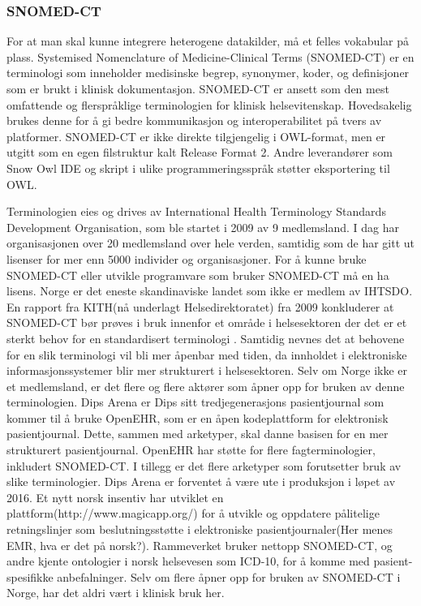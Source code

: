 \subsubsection{SNOMED-CT}
For at man skal kunne integrere heterogene datakilder, må et felles vokabular på plass. Systemised Nomenclature of Medicine-Clinical Terms (SNOMED-CT) er en terminologi som inneholder medisinske begrep, synonymer, koder, og definisjoner som er brukt i klinisk dokumentasjon. SNOMED-CT er ansett som den mest omfattende og flerspråklige terminologien for klinisk helsevitenskap\citep{Health_interoptability_HL7_SNOMED}. Hovedsakelig brukes denne for å gi bedre kommunikasjon og interoperabilitet på tvers av platformer. SNOMED-CT er ikke direkte tilgjengelig i OWL-format, men er utgitt som en egen filstruktur kalt Release Format 2. Andre leverandører som Snow Owl IDE\citep{Snow_owl} og skript i ulike programmeringsspråk støtter eksportering til OWL. 

Terminologien eies og drives av International Health Terminology Standards Development Organisation, som ble startet i 2009 av 9 medlemsland. I dag har organisasjonen over 20 medlemsland over hele verden, samtidig som de har gitt ut lisenser for mer enn 5000 individer og organisasjoner\citep{IHTSDO_members}. For å kunne bruke SNOMED-CT eller utvikle programvare som bruker SNOMED-CT må en ha lisens. Norge er det eneste skandinaviske landet som ikke er medlem av IHTSDO. En rapport fra KITH(nå underlagt Helsedirektoratet) fra 2009 konkluderer at SNOMED-CT bør prøves i bruk innenfor et område i helsesektoren der det er et sterkt behov for en standardisert terminologi \citep{KITH_SNOMED-CT}. Samtidig nevnes det at behovene for en slik terminologi vil bli mer åpenbar med tiden, da innholdet i elektroniske informasjonssystemer blir mer strukturert i helsesektoren. Selv om Norge ikke er et medlemsland, er det flere og flere aktører som åpner opp for bruken av denne terminologien. Dips Arena er Dips sitt tredjegenerasjons pasientjournal som kommer til å bruke OpenEHR, som er en åpen kodeplattform for elektronisk pasientjournal. Dette, sammen med arketyper, skal danne basisen for en mer strukturert pasientjournal\citep{Dips_OpenEHR}. OpenEHR har støtte for flere fagterminologier, inkludert SNOMED-CT. I tillegg er det flere arketyper som forutsetter bruk av slike terminologier. Dips Arena er forventet å være ute i produksjon i løpet av 2016. Et nytt norsk insentiv har utviklet en plattform(http://www.magicapp.org/) for å utvikle og oppdatere pålitelige retningslinjer som beslutningsstøtte i elektroniske pasientjournaler(Her menes EMR, hva er det på norsk?). Rammeverket bruker nettopp SNOMED-CT, og andre kjente ontologier i norsk helsevesen som ICD-10, for å komme med pasient-spesifikke anbefalninger\citep{MAGIC_HelsIT}. Selv om flere åpner opp for bruken av SNOMED-CT i Norge, har det aldri vært i klinisk bruk her.

